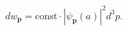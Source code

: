 \par\begin{equation}
 dw_{\mathbf p}=\mathrm{const}\cdot|\psi_{\mathbf p}(a)|^2d^3p.
 \tag{146.1}
\end{equation}
